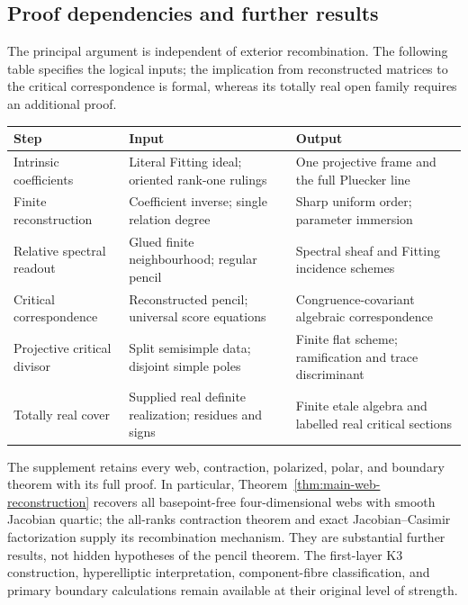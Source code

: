 \subsection{Proof dependencies and further results}
The principal argument is independent of exterior recombination.
The following table specifies the logical inputs; the implication
from reconstructed matrices to the critical correspondence is formal,
whereas its totally real open family requires an additional proof.

\begin{center}
\small
\begin{tabular}{@{}p{.22\linewidth}p{.33\linewidth}p{.37\linewidth}@{}}
\toprule
Step & Input & Output \\
\midrule
Intrinsic coefficients & Literal Fitting ideal; oriented rank-one
rulings & One projective frame and the full Pluecker line \\[3pt]
Finite reconstruction & Coefficient inverse; single relation degree &
Sharp uniform order; parameter immersion \\[3pt]
Relative spectral readout & Glued finite neighbourhood; regular pencil &
Spectral sheaf and Fitting incidence schemes \\[3pt]
Critical correspondence & Reconstructed pencil; universal score equations &
Congruence-covariant algebraic correspondence \\[3pt]
Projective critical divisor & Split semisimple data; disjoint simple poles &
Finite flat scheme; ramification and trace discriminant \\[3pt]
Totally real cover & Supplied real definite realization; residues and signs &
Finite etale algebra and labelled real critical sections \\
\bottomrule
\end{tabular}
\end{center}

The supplement retains every web, contraction, polarized, polar,
and boundary theorem with its full proof.  In particular,
Theorem~\ref{thm:main-web-reconstruction} recovers all basepoint-free
four-dimensional webs with smooth Jacobian quartic; the all-ranks
contraction theorem and exact Jacobian--Casimir factorization supply
its recombination mechanism.  They are substantial further results,
not hidden hypotheses of the pencil theorem.  The first-layer K3
construction, hyperelliptic interpretation, component-fibre
classification, and primary boundary calculations remain available
at their original level of strength.

